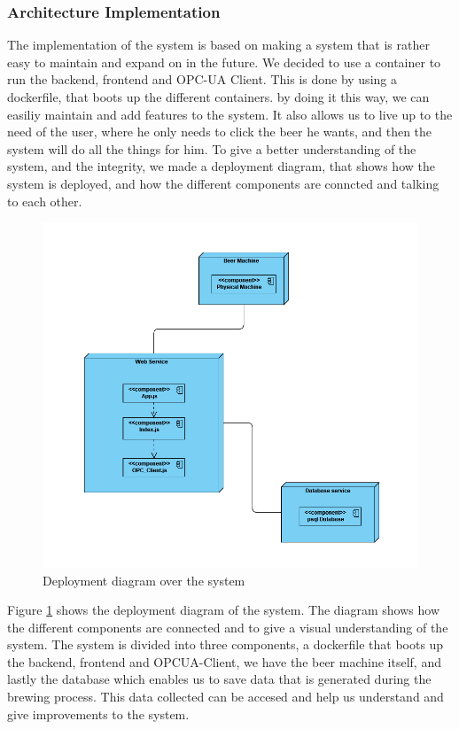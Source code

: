 \subsubsection{Architecture Implementation}
The implementation of the system is based on making a system that is rather easy to maintain and expand on in the future. We decided to use a container to run the backend, frontend and OPC-UA Client. This is done by using a dockerfile, that boots up the different containers.
by doing it this way, we can easiliy maintain and add features to the system. It also allows us to live up to the need of the user, where he only needs to click the beer he wants, and then the system will do all the things for him. \newline
To give a better understanding of the system, and the integrity, we made a deployment diagram, that shows how the system is deployed, and how the different components are conncted and talking to each other. \newline

\begin{center}
    \centering
    \begin{figure}[H]
        \includegraphics[width=1\textwidth]{img/Deployment_diagram.png}
        \caption{Deployment diagram over the system}
        \label{fig:Deployment_diagram}
    \end{figure}
\end{center}
Figure \ref{fig:Deployment_diagram} shows the deployment diagram of the system. The diagram shows how the different components are connected and to give a visual understanding of the system. The system is divided into three components, a dockerfile that boots up the backend, frontend and OPCUA-Client, we have the beer machine itself, and lastly the database which enables us to save data that is generated during the brewing process. This data collected can be accesed and help us understand and give improvements to the system. \newline

